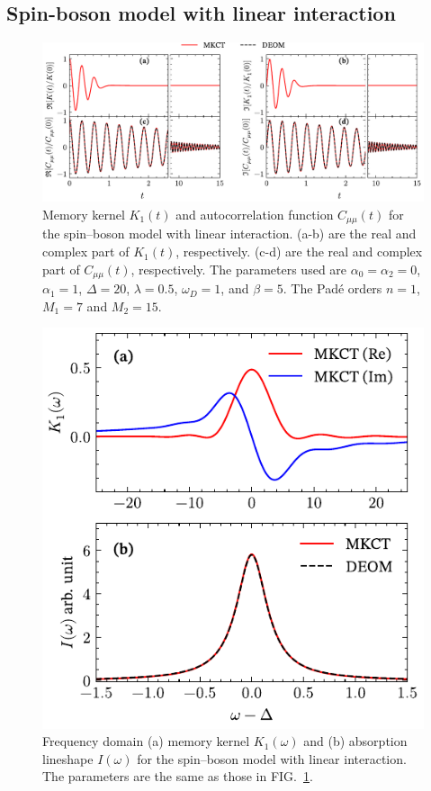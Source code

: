 \documentclass[preprint,aip,jcp]{revtex4-2}
\begin{document}
\subsection{Spin-boson model with linear interaction \label{subsec:sb_linear}}

\begin{figure}[htbp]
    \centering
    \includegraphics[width=0.99\linewidth]{figs/fig1-linear-time.pdf}
    \caption{Memory kernel $K_1(t)$ and autocorrelation function $C_{\mu\mu}(t)$ for the spin–boson model with linear interaction. (a-b) are the real and complex part of $K_1(t)$, respectively. (c-d) are the real and complex part of $C_{\mu\mu}(t)$, respectively. The parameters used are $\alpha_0=\alpha_2=0$, $\alpha_1=1$, $\Delta = 20$, $\lambda=0.5$, $\omega_D=1$, and $\beta = 5$. The Pad\'{e} orders $n=1$, $M_1=7$ and $M_2=15$.}
    \label{fig:linear_sb_time}
\end{figure}


\begin{figure}[htbp]
    \centering
    \includegraphics[width=0.49\linewidth]{figs/kernel_vs_corr_freq_lb.pdf}
    \caption{Frequency domain (a) memory kernel $K_1(\omega)$ and (b) absorption lineshape $I(\omega)$ for the spin–boson model with linear interaction. The parameters are the same as those in FIG.~\ref{fig:linear_sb_time}.}
    \label{fig:linear_sb_freq}
\end{figure}
\end{document}
